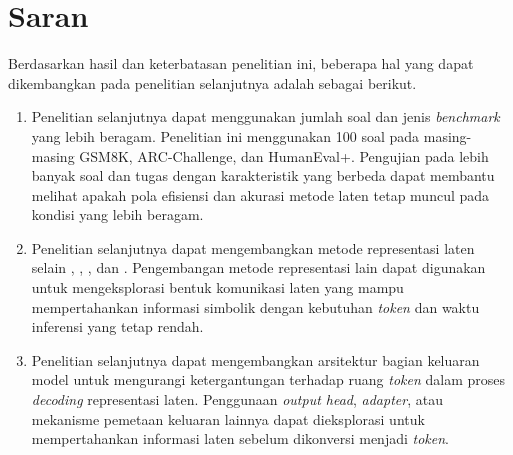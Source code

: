 \section{Saran}
\label{sec:saran}

Berdasarkan hasil dan keterbatasan penelitian ini, beberapa hal yang dapat
dikembangkan pada penelitian selanjutnya adalah sebagai berikut.

\begin{enumerate}

    \item
    Penelitian selanjutnya dapat menggunakan jumlah soal dan jenis
    \textit{benchmark} yang lebih beragam. Penelitian ini menggunakan 100 soal
    pada masing-masing GSM8K, ARC-Challenge, dan HumanEval+. Pengujian pada
    lebih banyak soal dan tugas dengan karakteristik yang berbeda dapat
    membantu melihat apakah pola efisiensi dan akurasi metode laten tetap
    muncul pada kondisi yang lebih beragam.

    \item
    Penelitian selanjutnya dapat mengembangkan metode representasi laten
    selain , , , dan . Pengembangan
    metode representasi lain dapat digunakan untuk mengeksplorasi bentuk
    komunikasi laten yang mampu mempertahankan informasi simbolik dengan
    kebutuhan \textit{token} dan waktu inferensi yang tetap rendah.

    \item
    Penelitian selanjutnya dapat mengembangkan arsitektur bagian keluaran
    model untuk mengurangi ketergantungan terhadap ruang \textit{token} dalam
    proses \textit{decoding} representasi laten. Penggunaan \textit{output
    head}, \textit{adapter}, atau mekanisme pemetaan keluaran lainnya dapat
    dieksplorasi untuk mempertahankan informasi laten sebelum dikonversi
    menjadi \textit{token}.

\end{enumerate}